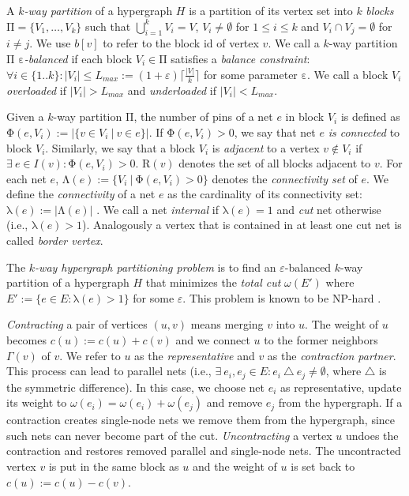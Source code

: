 \documentclass[runningheads,a4paper]{llncs}
\begin{document}
A \emph{$k$-way partition} of a hypergraph $H$ is a partition of its vertex set into $k$ \emph{blocks} $\mathrm{\Pi} = \{V_1, \dots, V_k\}$ 
such that $\bigcup_{i=1}^k V_i = V$, $V_i \neq \emptyset $ for $1 \leq i \leq k$ and $V_i \cap V_j = \emptyset$ for $i \neq j$. We use $b[v]$ to refer to the block id of vertex $v$.
We call a $k$-way partition $\mathrm{\Pi}$ \emph{$\mathrm{\varepsilon}$-balanced} if each block $V_i \in \mathrm{\Pi}$ satisfies a \emph{balance constraint}:
$\forall i \in \{1..k\}: |V_i| \leq L_{max} := (1+\varepsilon)\lceil \frac{|V|}{k} \rceil$ for some parameter $\mathrm{\varepsilon}$. 
We call a block $V_i$ \emph{overloaded} if $|V_i| > L_{max}$ and \emph{underloaded} if $|V_i| < L_{max}$.

Given a $k$-way partition $\mathrm{\Pi}$, the number of pins of a net $e$ in block $V_i$ is defined as 
$\mathrm{\Phi}(e,V_i) := |\{v \in V_i~|~v \in e \}|$. If $\mathrm{\Phi}(e, V_i) > 0$, we say that net $e$ \emph{is connected} to block $V_i$. Similarly, we say that a block $V_i$ is \emph{adjacent} to a vertex $v \notin V_i$ if $\exists~e \in  I(v): \mathrm{\Phi}(e, V_i) > 0$. $\mathrm{R}(v)$ denotes the set of all blocks adjacent to $v$.
For each net $e$, $\mathrm{\Lambda}(e) := \{V_i~|~ \mathrm{\Phi}(e, V_i) > 0\}$ denotes the \emph{connectivity set} of $e$. We define the \emph{connectivity} of a net $e$ as the cardinality of its connectivity set: $\mathrm{\lambda}(e) := |\mathrm{\Lambda}(e)|$ \cite{PaToH}.
We call a net  \emph{internal} if $\mathrm{\lambda}(e) = 1$ and \emph{cut} net otherwise (i.e., $\mathrm{\lambda}(e) > 1$). Analogously a vertex that is contained in at least one cut net is called \emph{border vertex}. 


The \emph{$k$-way hypergraph partitioning problem} is to find an $\varepsilon$-balanced $k$-way partition of a hypergraph $H$ that minimizes the \emph{total cut} $ \omega(E')$ where $E' := \{e \in E : \mathrm{\lambda}(e) > 1\}$ for some $\varepsilon$. This problem is known to be NP-hard \cite{Lengauer:1990}.

\emph{Contracting} a pair of vertices $(u, v)$ means merging $v$ into $u$. The weight of $u$ becomes $c(u) := c(u) + c(v)$ and we 
connect $u$ to the former neighbors $\Gamma(v)$ of $v$. We refer to $u$ as the \emph{representative} and $v$ as the \emph{contraction partner}. 
This process can lead to parallel nets (i.e., $\exists~e_i,e_j \in E : e_i~\triangle~e_j \neq \emptyset$, where $\triangle$ is the 
symmetric difference). In this case, we choose net $e_i$ as representative, update its weight to $\omega(e_i) = \omega(e_i) + \omega(e_j)$ 
and remove $e_j$ from the hypergraph. If a contraction creates single-node nets we remove them from the hypergraph, since such nets 
can never become part of the cut. \emph{Uncontracting} a vertex $u$ undoes the contraction and restores removed parallel and single-node nets. The uncontracted vertex $v$ is put in the same 
block as $u$ and the weight of $u$ is set back to $c(u) := c(u) - c(v)$.
\vfill
\end{document}
